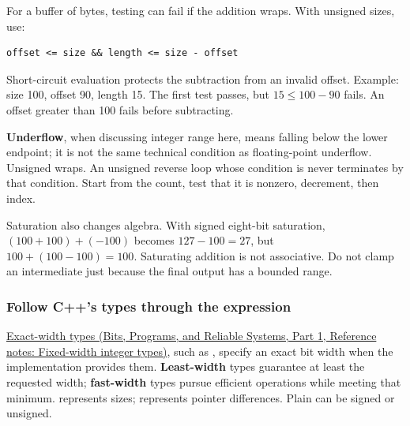 For a buffer of  bytes, testing  can fail if the addition wraps. With unsigned sizes, use:

\begin{verbatim}
offset <= size && length <= size - offset
\end{verbatim}

Short-circuit evaluation protects the subtraction from an invalid offset. Example: size 100, offset 90, length 15. The first test passes, but \(15\le 100-90\) fails. An offset greater than 100 fails before subtracting.

\textbf{Underflow}, when discussing integer range here, means falling below the lower endpoint; it is not the same technical condition as floating-point underflow. Unsigned  wraps. An unsigned reverse loop whose condition is  never terminates by that condition. Start from the count, test that it is nonzero, decrement, then index.

Saturation also changes algebra. With signed eight-bit saturation, \((100+100)+(-100)\) becomes \(127-100=27\), but \(100+(100-100)=100\). Saturating addition is not associative. Do not clamp an intermediate just because the final output has a bounded range.

\subsubsection{Follow C++'s types through the expression}\label{05-engine-i-ch001-follow-cs-types-through-the-expression}

\hypertarget{05-engine-i-ch001-follow-cs-types-through-the-expression}{}

\href{../01-Bits-Programs-and-Reliable-Systems-P01/main.pdf\#appendix-cc04044b5782}{Exact-width types (Bits, Programs, and Reliable Systems, Part 1, Reference notes: Fixed-width integer types)}, such as , specify an exact bit width when the implementation provides them. \textbf{Least-width} types guarantee at least the requested width; \textbf{fast-width} types pursue efficient operations while meeting that minimum.  represents sizes;  represents pointer differences. Plain  can be signed or unsigned.

